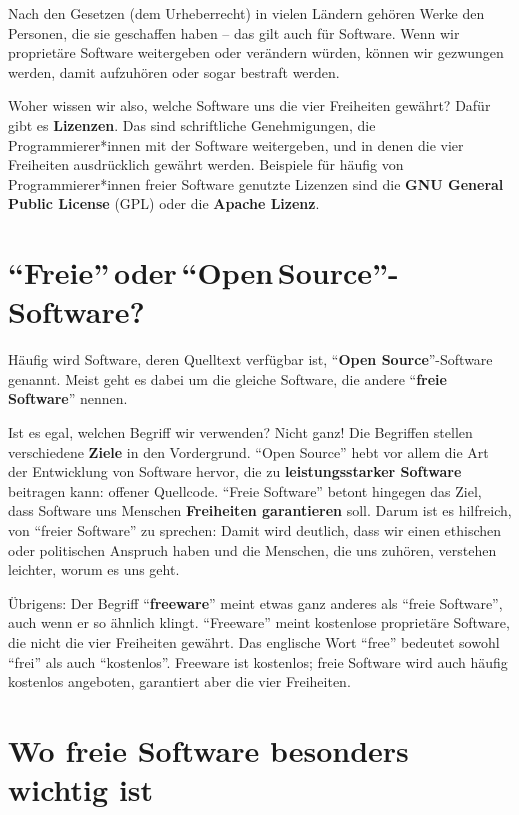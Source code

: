 \documentclass[a5paper,12pt]{scrartcl}
\begin{document}
Nach den Gesetzen (dem Urheberrecht) in vielen Ländern gehören Werke
den Personen, die sie geschaffen haben -- das gilt auch für
Software. Wenn wir proprietäre Software weitergeben oder verändern
würden, können wir gezwungen werden, damit aufzuhören oder sogar
bestraft werden.

Woher wissen wir also, welche Software uns die vier Freiheiten
gewährt? Dafür gibt es \textbf{Lizenzen}. Das sind schriftliche
Genehmigungen, die Programmierer*innen mit der Software weitergeben,
und in denen die vier Freiheiten ausdrücklich gewährt
werden. Beispiele für häufig von Programmierer*innen freier Software
genutzte Lizenzen sind die \textbf{GNU General Public License} (GPL)
oder die \textbf{Apache Lizenz}.


\section{"`Freie"'\,oder\,"`Open\,Source"'-Software?}

Häufig wird Software, deren Quelltext verfügbar ist, "`\textbf{Open
  Source}"'-Software genannt. Meist geht es dabei um die gleiche
Software, die andere "`\textbf{freie Software}"' nennen.

Ist es egal, welchen Begriff wir verwenden? Nicht ganz! Die Begriffen
stellen verschiedene \textbf{Ziele} in den Vordergrund. "`Open
Source"' hebt vor allem die Art der Entwicklung von Software hervor,
die zu \textbf{leistungsstarker Software} beitragen kann: offener
Quellcode. "`Freie Software"' betont hingegen das Ziel, dass Software
uns Menschen \textbf{Freiheiten garantieren} soll. Darum ist es
hilfreich, von "`freier Software"' zu sprechen: Damit wird deutlich,
dass wir einen ethischen oder politischen Anspruch haben und die
Menschen, die uns zuhören, verstehen leichter, worum es uns geht.

Übrigens: Der Begriff "`\textbf{freeware}"' meint etwas ganz anderes
als "`freie Software"', auch wenn er so ähnlich klingt. "`Freeware"'
meint kostenlose proprietäre Software, die nicht die vier Freiheiten
gewährt. Das englische Wort "`free"' bedeutet sowohl "`frei"' als auch
"`kostenlos"'. Freeware ist kostenlos; freie Software wird auch häufig
kostenlos angeboten, garantiert aber die vier Freiheiten.


\section{Wo freie Software besonders wichtig ist}
\end{document}
